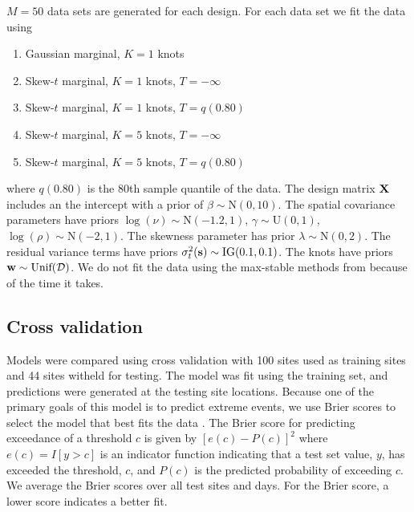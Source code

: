 \documentclass[11pt]{article}
\begin{document}
$M = 50$ data sets are generated for each design.
For each data set we fit the data using
\begin{enumerate} \setlength{\itemsep}{-0.5em}
  \item Gaussian marginal, $K=1$ knots
  \item Skew-$t$ marginal, $K=1$ knots, $T=-\infty$
  \item Skew-$t$ marginal, $K=1$ knots, $T=q(0.80)$
  \item Skew-$t$ marginal, $K=5$ knots, $T=-\infty$
  \item Skew-$t$ marginal, $K=5$ knots, $T=q(0.80)$
\end{enumerate}
where $q(0.80)$ is the 80th sample quantile of the data.
The design matrix $\mbox{\bf X}$ includes an the intercept with a prior of $\beta \sim \text{N}(0, 10)$.
The spatial covariance parameters have priors $\log(\nu) \sim \text{N}(-1.2, 1)$, $\gamma \sim \text{U}(0, 1)$, $\log(\rho) \sim \text{N}(-2, 1)$.
The skewness parameter has prior $\lambda \sim \text{N}(0, 2)$.
The residual variance terms have priors $\sigma^2_t(\mbox{\bf s}) \sim \text{IG}(0.1, 0.1)$.
The knots have priors $\mbox{\bf w} \sim \text{Unif}({\cal D})$.
We do not fit the data using the max-stable methods from \citet{Reich2012} because of the time it takes.

\subsection{Cross validation}\label{s:modelselect}
Models were compared using cross validation with 100 sites used as training sites and 44 sites witheld for testing.
The model was fit using the training set, and predictions were generated at the testing site locations.
Because one of the primary goals of this model is to predict extreme events, we use Brier scores to select the model that best fits the data \citep{Gneiting2007}.
The Brier score for predicting exceedance of a threshold $c$ is given by $[e(c) - P(c)]^2$ where $e(c) = I[y>c]$ is an indicator function indicating that a test set value, $y$, has exceeded the threshold, $c$, and $P(c)$ is the predicted probability of exceeding $c$.
We average the Brier scores over all test sites and days.
For the Brier score, a lower score indicates a better fit.
\end{document}
